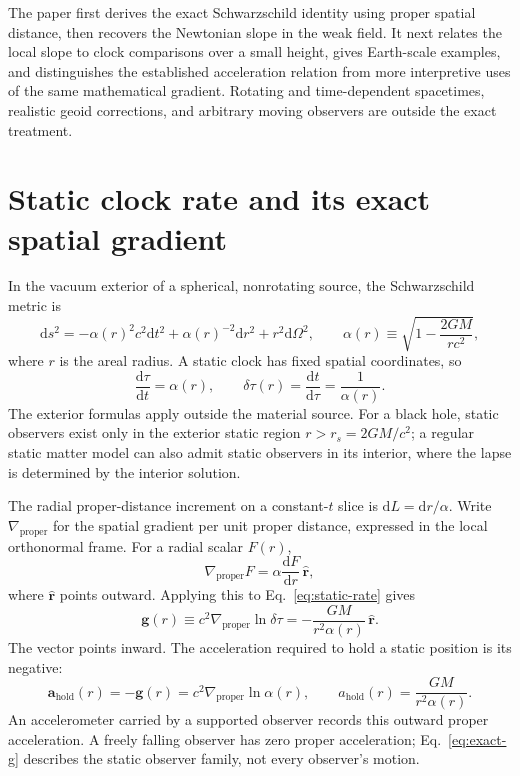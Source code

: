 \documentclass[12pt]{article}
\begin{document}
The paper first derives the exact Schwarzschild identity using proper spatial distance, then recovers the Newtonian slope in the weak field. It next relates the local slope to clock comparisons over a small height, gives Earth-scale examples, and distinguishes the established acceleration relation from more interpretive uses of the same mathematical gradient. Rotating and time-dependent spacetimes, realistic geoid corrections, and arbitrary moving observers are outside the exact treatment.

\section{Static clock rate and its exact spatial gradient}

In the vacuum exterior of a spherical, nonrotating source, the Schwarzschild metric is \cite{Schwarzschild}
\begin{equation}
  \mathrm{d}s^2
  =-\alpha(r)^2c^2\mathrm{d}t^2
   +\alpha(r)^{-2}\mathrm{d}r^2+r^2\mathrm{d}\Omega^2,
  \qquad
  \alpha(r)\equiv\sqrt{1-\frac{2GM}{rc^2}},
  \label{eq:metric}
\end{equation}
where $r$ is the areal radius. A static clock has fixed spatial coordinates, so
\begin{equation}
  \frac{\mathrm{d}\tau}{\mathrm{d}t}=\alpha(r),
  \qquad
  \delta\tau(r)=\frac{\mathrm{d}t}{\mathrm{d}\tau}=\frac{1}{\alpha(r)}.
  \label{eq:static-rate}
\end{equation}
The exterior formulas apply outside the material source. For a black hole, static observers exist only in the exterior static region $r>r_s=2GM/c^2$; a regular static matter model can also admit static observers in its interior, where the lapse is determined by the interior solution.

The radial proper-distance increment on a constant-$t$ slice is $\mathrm{d}L=\mathrm{d}r/\alpha$. Write $\nabla_{\mathrm{proper}}$ for the spatial gradient per unit proper distance, expressed in the local orthonormal frame. For a radial scalar $F(r)$,
\begin{equation}
  \nabla_{\mathrm{proper}}F
  =\alpha\frac{\mathrm{d}F}{\mathrm{d}r}\,\hat{\mathbf r},
  \label{eq:proper-gradient}
\end{equation}
where $\hat{\mathbf r}$ points outward. Applying this to Eq.~\eqref{eq:static-rate} gives
\begin{equation}
  \mathbf{g}(r)
  \equiv c^2\nabla_{\mathrm{proper}}\ln\delta\tau
  =-\frac{GM}{r^2\alpha(r)}\,\hat{\mathbf r}.
  \label{eq:exact-g}
\end{equation}
The vector points inward. The acceleration required to hold a static position is its negative:
\begin{equation}
  \mathbf{a}_{\mathrm{hold}}(r)
  =-\mathbf{g}(r)
  =c^2\nabla_{\mathrm{proper}}\ln\alpha(r),
  \qquad
  a_{\mathrm{hold}}(r)=\frac{GM}{r^2\alpha(r)}.
  \label{eq:hold-acceleration}
\end{equation}
An accelerometer carried by a supported observer records this outward proper acceleration. A freely falling observer has zero proper acceleration; Eq.~\eqref{eq:exact-g} describes the static observer family, not every observer's motion.
\end{document}
